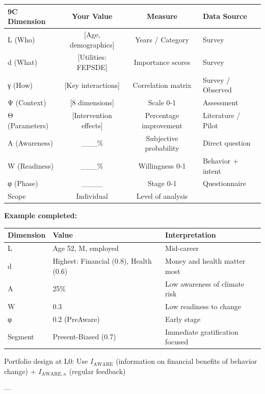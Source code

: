\begin{center}
\begin{tabular}{@{}lccl@{}}
\toprule
\textbf{9C Dimension} & \textbf{Your Value} & \textbf{Measure} & \textbf{Data Source} \\
\midrule
L (Who) & [Age, demographics] & Years / Category & Survey \\
d (What) & [Utilities: FEPSDE] & Importance scores & Survey \\
γ (How) & [Key interactions] & Correlation matrix & Survey / Observed \\
Ψ (Context) & [8 dimensions] & Scale 0-1 & Assessment \\
Θ (Parameters) & [Intervention effects] & Percentage improvement & Literature / Pilot \\
A (Awareness) & \_\_\_\% & Subjective probability & Direct question \\
W (Readiness) & \_\_\_\% & Willingness 0-1 & Behavior + intent \\
φ (Phase) & \_\_\_\_ & Stage 0-1 & Questionnaire \\
Scope & Individual & Level of analysis & \\
\midrule
\end{tabular}
\end{center}

\textbf{Example completed:}
\begin{center}
\begin{tabular}{@{}lll@{}}
\toprule
\textbf{Dimension} & \textbf{Value} & \textbf{Interpretation} \\
\midrule
L & Age 52, M, employed & Mid-career \\
d & Highest: Financial (0.8), Health (0.6) & Money and health matter most \\
A & 25\% & Low awareness of climate risk \\
W & 0.3 & Low readiness to change \\
φ & 0.2 (PreAware) & Early stage \\
Segment & Present-Biased (0.7) & Immediate gratification focused \\
\midrule
\end{tabular}
\end{center}

Portfolio design at L0: Use $I_{\text{AWARE}}$ (information on financial benefits of behavior change) + $I_{\text{AWARE},\kappa}$ (regular feedback)

---


